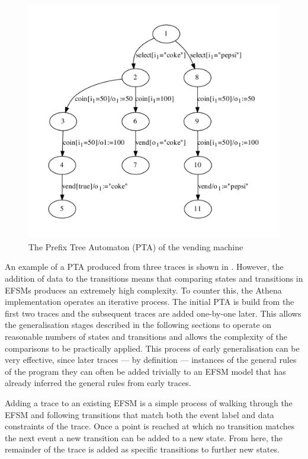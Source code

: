 \begin{figure}[h]
\begin{center}
\includegraphics[width=12cm]{figures/efsm/vend1.pdf}
\caption{The Prefix Tree Automaton (PTA) of the vending machine}
\label{fig:pta}
\end{center}
\end{figure}

An example of a PTA produced from three traces is shown in . However, the addition of data to the transitions means that comparing states and transitions in EFSMs produces an extremely high complexity. To counter this, the Athena implementation operates an iterative process. The initial PTA is build from the first two traces and the subsequent traces are added one-by-one later. This allows the generalisation stages described in the following sections to operate on reasonable numbers of states and transitions and allows the complexity of the comparisons to be practically applied. This process of early generalisation can be very effective, since later traces --- by definition --- instances of the general rules of the program they can often be added trivially to an EFSM model that has already inferred the general rules from early traces.

Adding a trace to an existing EFSM is a simple process of walking through the EFSM and following transitions that match both the event label and data constraints of the trace. Once a point is reached at which no transition matches the next event a new transition can be added to a new state. From here, the remainder of the trace is added as specific transitions to further new states. 

